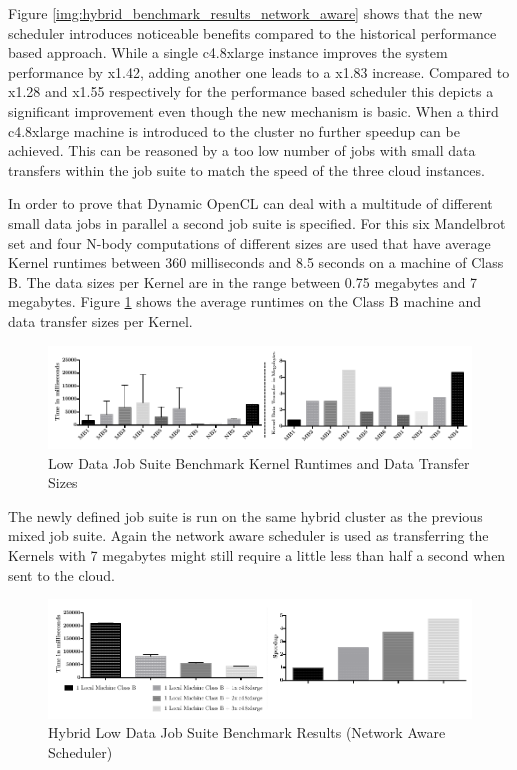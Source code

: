 Figure \ref{img:hybrid_benchmark_results_network_aware} shows that the new scheduler introduces noticeable benefits compared to the historical performance based approach. While a single c4.8xlarge instance improves the system performance by x1.42, adding another one leads to a x1.83 increase. Compared to x1.28 and x1.55 respectively for the performance based scheduler this depicts a significant improvement even though the new mechanism is basic. When a third c4.8xlarge machine is introduced to the cluster no further speedup can be achieved. This can be reasoned by a too low number of jobs with small data transfers within the job suite to match the speed of the three cloud instances.

In order to prove that Dynamic OpenCL can deal with a multitude of different small data jobs in parallel a second job suite is specified. For this six Mandelbrot set and four N-body computations of different sizes are used that have average Kernel runtimes between 360 milliseconds and 8.5 seconds on a machine of Class B. The data sizes per Kernel are in the range between 0.75 megabytes and 7 megabytes. Figure \ref{img:low_data_benchmark_statistics} shows the average runtimes on the Class B machine and data transfer sizes per Kernel.

\begin{figure}[H]	
	\includegraphics[width=1.0\textwidth]{images/lowdata_benchmark_statistics.pdf}
	\centering
	\caption{Low Data Job Suite Benchmark Kernel Runtimes and Data Transfer Sizes}
	\label{img:low_data_benchmark_statistics}
\end{figure}

The newly defined job suite is run on the same hybrid cluster as the previous mixed job suite. Again the network aware scheduler is used as transferring the Kernels with 7 megabytes might still require a little less than half a second when sent to the cloud.

\begin{figure}[H]	
	\includegraphics[width=1.0\textwidth]{images/hybrid_lowdata_benchmark.pdf}
	\centering
	\caption{Hybrid Low Data Job Suite Benchmark Results (Network Aware Scheduler)}
	\label{img:hybrid_low_data_benchmark_results_network_aware}
\end{figure}


